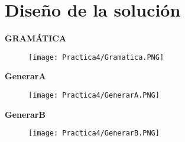 \documentclass[12pt]{article}
\begin{document}

	\section{Diseño de la solución}
		\textbf{GRAMÁTICA}
		\begin{figure}[H]
		    \centering
		    \texttt{[image: Practica4/Gramatica.PNG]}
		\end{figure}
		
		\textbf{GenerarA}
		\begin{figure}[H]
		    \centering
	        \texttt{[image: Practica4/GenerarA.PNG]}
		\end{figure}
		\textbf{GenerarB}
		\begin{figure}[H]
		    \centering
		    \texttt{[image: Practica4/GenerarB.PNG]}
		\end{figure}
\end{document}
